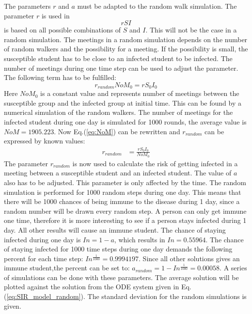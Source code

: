 \documentclass[%
twoside,                 %
final,                   %
chapterprefix=true,      %
open=right               %
10pt]{book}
\begin{document}
The parameters $r$ and $a$ must be adapted to the random walk simulation. The parameter $r$ is used in
\begin{equation} \label{eq:rSI}
rSI
\end{equation}
is based on all possible combinations of $S$ and $I$. This will not be the case in a random simulation. The meetings in a random simulation depends on the number of random walkers and the possibility for a meeting. If the possibility is small, the susceptible student has to be close to an infected student to be infected. The number of meetings during one time step can be used to adjust the parameter. The following term has to be fulfilled:   
\begin{equation} \label{eq:NoM}
r_{random}NoM_0 = rS_0I_0
\end{equation}
Here $NoM_0$ is a constant value and represents number of meetings between the susceptible group and the infected group at initial time. This can be found by a numerical simulation of the random walkers. The number of meetings for the infected student during one day is simulated for 1000 rounds, the average value is $NoM=1905.223$. Now Eq.(\ref{eq:NoM}) can be rewritten and $r_{random}$ can be expressed by known values: 
\begin{equation} \label{eq:NoM}
	\begin{aligned} 
	r_{random} &= \frac{rS_0I_0}{NoM_0}
	\end{aligned}
\end{equation}
The parameter $r_{random}$ is now used to calculate the risk of getting infected in a meeting between a susceptible student and an infected student. The value of $a$ also has to be adjusted. This parameter is only affected by the time. The random simulation is performed for 1000 random steps during one day. This means that there will be 1000 chances of being immune to the disease during 1 day, since a random number will be drawn every random step. A person can only get immune one time, therefore it is more interesting to see if a person stays infected during 1 day. All other results will cause an immune student. The chance of staying infected during one day is $In = 1-a$, which results in $In=0.55964$. The chance of staying infected for 1000 time steps during one day demands the following percent for each time step: $In^{\frac{1}{1000}}= 0.9994197$. Since all other solutions gives an immune student,the percent can be set to: $a_{random} = 1-In^{\frac{1}{1000}}= 0.00058$. A series of simulations can be done with these parameters. The average solution will be plotted against the solution from the ODE system given in Eq.(\ref{eq:SIR_model_random}). The standard deviation for the random simulations is given.
\end{document}
